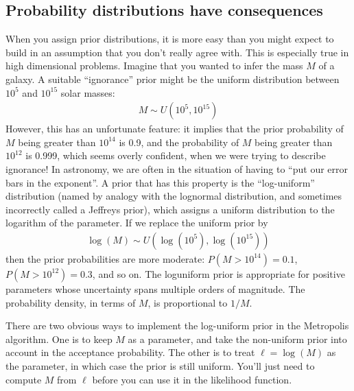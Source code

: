 \subsection{Probability distributions have consequences}
When you assign prior distributions, it is more easy than you might expect to
build in an assumption that you don't really agree with. This is especially
true in high dimensional problems. Imagine that you wanted to infer the mass
$M$ of a galaxy. A suitable ``ignorance'' prior might be the uniform distribution
between $10^{5}$ and $10^{15}$ solar masses:
\begin{eqnarray}
M \sim U(10^{5}, 10^{15})
\end{eqnarray}
However, this has an unfortunate feature: it implies that the prior probability
of $M$ being greater than $10^{14}$ is 0.9, and the probability of $M$ being
greater than $10^{12}$ is 0.999, which seems overly confident, when we were
trying to describe ignorance! In astronomy,
we are often in the situation of having to ``put our error bars in the
exponent''. A prior that has this property is the ``log-uniform'' distribution
(named by analogy with the lognormal distribution, and sometimes incorrectly
called a Jeffreys prior), which assigns a uniform distribution to the logarithm
of the parameter. If we replace the uniform prior by
\begin{eqnarray}
\log(M) \sim U(\log(10^{5}), \log(10^{15}))
\end{eqnarray}
then the prior probabilities are more moderate: $P(M > 10^{14}) = 0.1$,
$P(M > 10^{12}) = 0.3$, and so on. The loguniform prior is appropriate for
positive parameters whose uncertainty spans multiple orders of magnitude.
The probability density, in terms of $M$, is proportional to $1/M$.

There are two obvious ways to implement the log-uniform prior in the Metropolis
algorithm. One is to keep $M$ as a parameter, and take the non-uniform prior
into account in the acceptance probability. The other is to treat
$\ell = \log(M)$ as the parameter, in which case the prior is still uniform.
You'll just need to compute $M$ from $\ell$ before you can use it in the
likelihood function.



